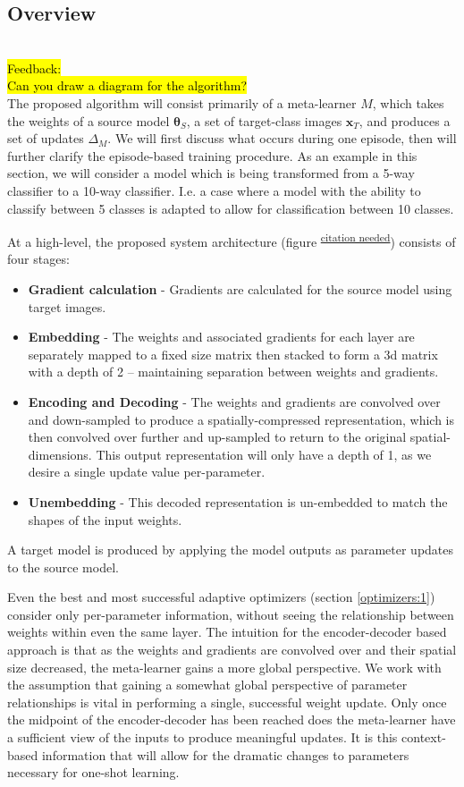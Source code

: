 \documentclass{report}
\newcommand{\FEEDBACK}[1]{\sethlcolor{green}\hl{\\ Feedback: \\#1\\}}
\newcommand{\TOCITE}[2][citation needed]{\textsuperscript{\underline{#1}}}
\begin{document}
	\subsection{Overview}
	\FEEDBACK{Can you draw a diagram for the algorithm?}
	The proposed algorithm will consist primarily of a meta-learner $M$, which takes the weights of a source model $\bm{\theta}_S$, a set of target-class images $\bm{x}_T$, and produces a set of updates $\Delta_M$. We will first discuss what occurs during one episode, then will further clarify the episode-based training procedure. As an example in this section, we will consider a model which is being transformed from a 5-way classifier to a 10-way classifier. I.e. a case where a model with the ability to classify between 5 classes is adapted to allow for classification between 10 classes. \par
	At a high-level, the proposed system architecture (figure \TOCITE{}) consists of four stages: 
	\begin{itemize}
		\item \textbf{Gradient calculation} - Gradients are calculated for the source model using target images.
		\item \textbf{Embedding} - The weights and associated gradients for each layer are separately mapped to a fixed size matrix then stacked to form a 3d matrix with a depth of 2 -- maintaining separation between weights and gradients.
		\item \textbf{Encoding and Decoding} - The weights and gradients are convolved over and down-sampled to produce a spatially-compressed representation, which is then convolved over further and up-sampled to return to the original spatial-dimensions. This output representation will only have a depth of 1, as we desire a single update value per-parameter.
		\item \textbf{Unembedding} - This decoded representation is un-embedded to match the shapes of the input weights.
	\end{itemize}
	A target model is produced by applying the model outputs as parameter updates to the source model. \par
	Even the best and most successful adaptive optimizers (section \ref{optimizers:1}) consider only per-parameter information, without seeing the relationship between weights within even the same layer. The intuition for the encoder-decoder based approach is that as the weights and gradients are convolved over and their spatial size decreased, the meta-learner gains a more global perspective. We work with the assumption that gaining a somewhat global perspective of parameter relationships is vital in performing a single, successful weight update. Only once the midpoint of the encoder-decoder has been reached does the meta-learner have a sufficient view of the inputs to produce meaningful updates. It is this context-based information that will allow for the dramatic changes to parameters necessary for one-shot learning. \par
\end{document}
